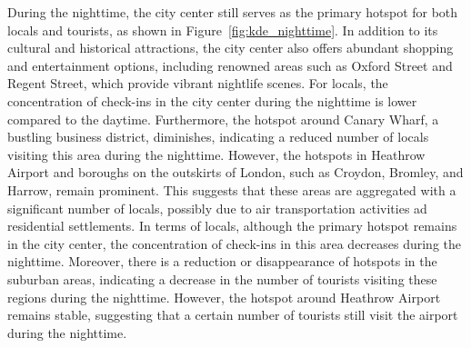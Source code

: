 \documentclass{article}
\theoremstyle{definition}
\theoremstyle{remark}
\begin{document}
During the nighttime, the city center still serves as the primary hotspot for both locals and tourists, as shown in Figure~\ref{fig:kde_nighttime}. In addition to its cultural and historical attractions, the city center also offers abundant shopping and entertainment options, including renowned areas such as Oxford Street and Regent Street, which provide vibrant nightlife scenes. For locals, the concentration of check-ins in the city center during the nighttime is lower compared to the daytime. Furthermore, the hotspot around Canary Wharf, a bustling business district, diminishes, indicating a reduced number of locals visiting this area during the nighttime. However, the hotspots in Heathrow Airport and boroughs on the outskirts of London, such as Croydon, Bromley, and Harrow, remain prominent. This suggests that these areas are aggregated with a significant number of locals, possibly due to air transportation activities ad residential settlements. In terms of locals, although the primary hotspot remains in the city center, the concentration of check-ins in this area decreases during the nighttime. Moreover, there is a reduction or disappearance of hotspots in the suburban areas, indicating a decrease in the number of tourists visiting these regions during the nighttime. However, the hotspot around Heathrow Airport remains stable, suggesting that a certain number of tourists still visit the airport during the nighttime.
\end{document}
